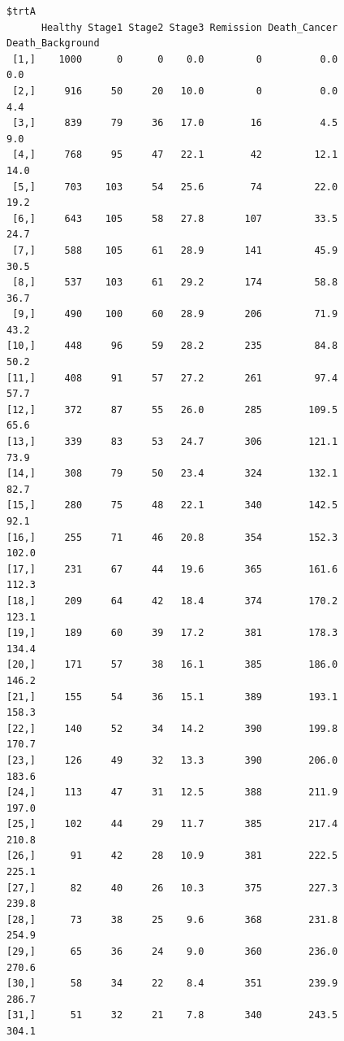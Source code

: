\documentclass[
  letterpaper,
  DIV=11,
  numbers=noendperiod]{scrartcl}
\begin{document}
\begin{verbatim}
$trtA
      Healthy Stage1 Stage2 Stage3 Remission Death_Cancer Death_Background
 [1,]    1000      0      0    0.0         0          0.0              0.0
 [2,]     916     50     20   10.0         0          0.0              4.4
 [3,]     839     79     36   17.0        16          4.5              9.0
 [4,]     768     95     47   22.1        42         12.1             14.0
 [5,]     703    103     54   25.6        74         22.0             19.2
 [6,]     643    105     58   27.8       107         33.5             24.7
 [7,]     588    105     61   28.9       141         45.9             30.5
 [8,]     537    103     61   29.2       174         58.8             36.7
 [9,]     490    100     60   28.9       206         71.9             43.2
[10,]     448     96     59   28.2       235         84.8             50.2
[11,]     408     91     57   27.2       261         97.4             57.7
[12,]     372     87     55   26.0       285        109.5             65.6
[13,]     339     83     53   24.7       306        121.1             73.9
[14,]     308     79     50   23.4       324        132.1             82.7
[15,]     280     75     48   22.1       340        142.5             92.1
[16,]     255     71     46   20.8       354        152.3            102.0
[17,]     231     67     44   19.6       365        161.6            112.3
[18,]     209     64     42   18.4       374        170.2            123.1
[19,]     189     60     39   17.2       381        178.3            134.4
[20,]     171     57     38   16.1       385        186.0            146.2
[21,]     155     54     36   15.1       389        193.1            158.3
[22,]     140     52     34   14.2       390        199.8            170.7
[23,]     126     49     32   13.3       390        206.0            183.6
[24,]     113     47     31   12.5       388        211.9            197.0
[25,]     102     44     29   11.7       385        217.4            210.8
[26,]      91     42     28   10.9       381        222.5            225.1
[27,]      82     40     26   10.3       375        227.3            239.8
[28,]      73     38     25    9.6       368        231.8            254.9
[29,]      65     36     24    9.0       360        236.0            270.6
[30,]      58     34     22    8.4       351        239.9            286.7
[31,]      51     32     21    7.8       340        243.5            304.1


\end{verbatim}
\end{document}
